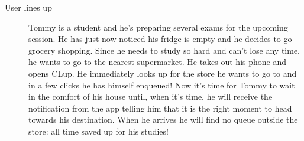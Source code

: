 \begin{description}
    \item[User lines up] 
    Tommy is a student and he’s preparing several exams for the upcoming session.
    He has just now noticed his fridge is empty and he decides to go grocery shopping. Since he needs to study so hard and can't lose any time, he wants to go to the nearest supermarket. He takes out his phone and opens CLup. He immediately looks up for the store he wants to go to and in a few clicks he has himself enqueued! 
    Now it's time for Tommy to wait in the comfort of his house until, when it’s time, he will receive the notification from the app telling him that it is the right moment to head towards his destination. When he arrives he will find no queue outside the store: all time saved up for his studies!



\end{description}
